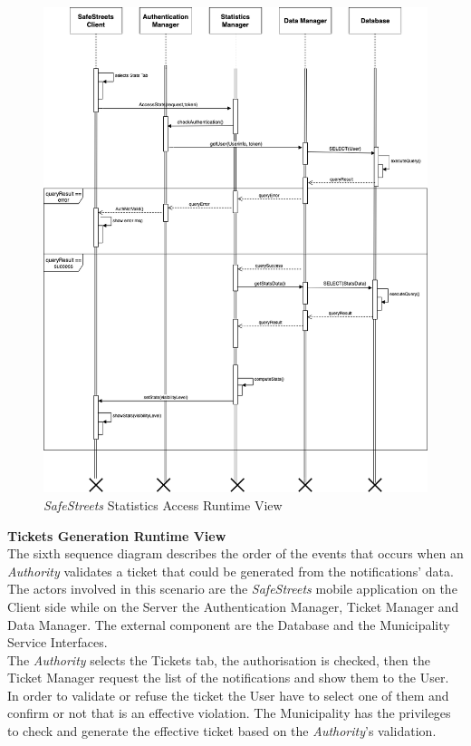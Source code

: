 \documentclass{article}
\begin{document}
	\begin{figure}[H]
			\centering
			\includegraphics[scale=0.34]{Images/Diagrams/Runtime/stats_runtime.png}
			\caption{{\it SafeStreets} Statistics Access Runtime View}
	\end{figure}
	\pagebreak
	\noindent
	{\bf Tickets Generation Runtime View} \\
	The sixth sequence diagram describes the order of the events that occurs when an {\it Authority} validates a ticket that could be generated from the notifications' data. The actors involved in this scenario are the {\it SafeStreets} mobile application on the Client side while on the Server the Authentication Manager, Ticket Manager and Data Manager. The external component are the Database and the Municipality Service Interfaces. \\
	The {\it Authority} selects the Tickets tab, the authorisation is checked, then the Ticket Manager request the list of the notifications and show them to the User. In order to validate or refuse the ticket the User have to select one of them and confirm or not that is an effective violation. The Municipality has the privileges to check and generate the effective ticket based on the {\it Authority}'s validation.
\end{document}
